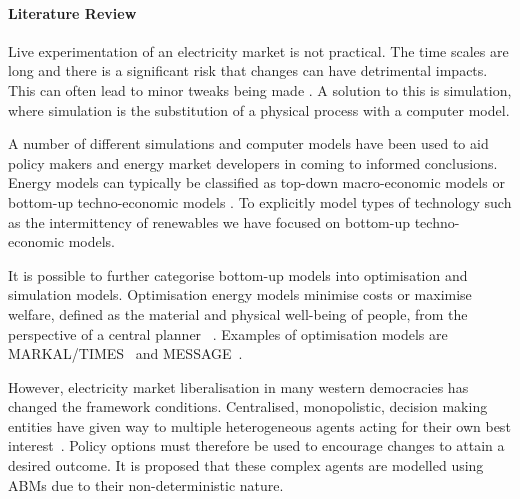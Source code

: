 \documentclass[12pt]{article}
\begin{document}
\paragraph{Literature Review}

Live experimentation of an electricity market is not practical. The time scales are long and there is a significant risk that changes can have detrimental impacts. This can often lead to minor tweaks being made \cite{Forshaw2016}. A solution to this is simulation, where simulation is the substitution of a physical process with a computer model.

A number of different simulations and computer models have been used to aid policy makers and energy market developers in  coming to informed conclusions. Energy models can typically be classified as top-down macro-economic models or bottom-up techno-economic models \cite{Bohringer1998}. To explicitly model types of technology such as the intermittency of renewables we have focused on bottom-up techno-economic models.

It is possible to further categorise bottom-up models into optimisation and simulation models. Optimisation energy models minimise costs or maximise welfare, defined as the material and physical well-being of people, from the perspective of a central planner ~\cite{Keles2017}. Examples of optimisation models are MARKAL/TIMES~\cite{Fishbone1981} and MESSAGE~\cite{Schrattenholzer1981}. 

However, electricity market liberalisation in many western democracies has changed the framework conditions. Centralised, monopolistic, decision making entities have given way to multiple heterogeneous agents acting for their own best interest~\cite{Most2010}. Policy options must therefore be used to encourage changes to attain a desired outcome. It is proposed that these complex agents are modelled using ABMs due to their non-deterministic nature. 
\end{document}
